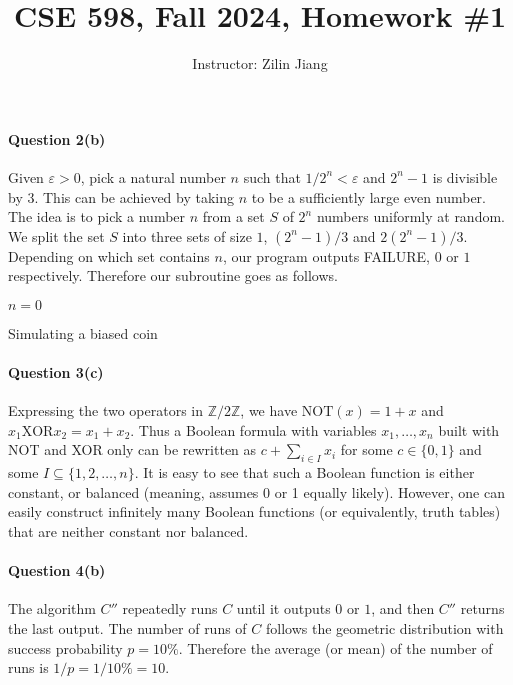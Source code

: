 \documentclass[12pt,answers]{exam}
\title{CSE 598, Fall 2024, Homework \#1}
\date{}
\author{Instructor: Zilin Jiang}
\theoremstyle{remark}
\newcommand{\eps}{\varepsilon}
\begin{document}
\maketitle

\paragraph{Question 2(b)} Given $\eps > 0$, pick a natural number $n$ such that $1/2^n < \eps$ and $2^n - 1$ is divisible by $3$. This can be achieved by taking $n$ to be a sufficiently large even number. The idea is to pick a number $n$ from a set $S$ of $2^n$ numbers uniformly at random. We split the set $S$ into three sets of size $1$, $(2^n-1)/3$ and $2(2^n-1)/3$. Depending on which set contains $n$, our program outputs FAILURE, $0$ or $1$ respectively. Therefore our subroutine goes as follows.

\begin{algorithm}
    \SetAlgoLined
    $n = 0$\;
    \caption{Simulating a biased coin}
\end{algorithm}

\paragraph{Question 3(c)} Expressing the two operators in $\mathbb{Z}/2\mathbb{Z}$, we have $\mathrm{NOT}(x) = 1 + x$ and $x_1 \mathrm{XOR} x_2 = x_1 + x_2$. Thus a Boolean formula with variables $x_1, \dots, x_n$ built with NOT and XOR only can be rewritten as $c + \sum_{i\in I} x_i$ for some $c \in \{0,1\}$ and some $I \subseteq \{1,2,\dots, n\}$. It is easy to see that such a Boolean function is either constant, or balanced (meaning, assumes 0 or 1 equally likely). However, one can easily construct infinitely many Boolean functions (or equivalently, truth tables) that are neither constant nor balanced.

\paragraph{Question 4(b)} The algorithm $C''$ repeatedly runs $C$ until it outputs $0$ or $1$, and then $C''$ returns the last output. The number of runs of $C$ follows the geometric distribution with success probability $p = 10\%$. Therefore the average (or mean) of the number of runs is $1/p = 1/10\% = 10$.
\end{document}
